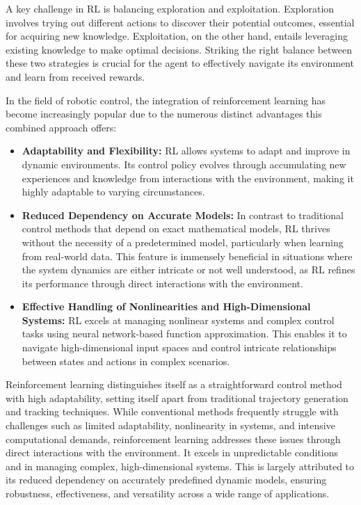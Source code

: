 A key challenge in RL is balancing exploration and exploitation. Exploration involves trying out different actions to discover their potential outcomes, essential for acquiring new knowledge. Exploitation, on the other hand, entails leveraging existing knowledge to make optimal decisions. Striking the right balance between these two strategies is crucial for the agent to effectively navigate its environment and learn from received rewards.

In the field of robotic control, the integration of reinforcement learning has become increasingly popular due to the numerous distinct advantages this combined approach offers:

\begin{itemize}
    \item \textbf{Adaptability and Flexibility:}
    RL allows systems to adapt and improve in dynamic environments. Its control policy evolves through accumulating new experiences and knowledge from interactions with the environment, making it highly adaptable to varying circumstances.

    \item \textbf{Reduced Dependency on Accurate Models:}
    In contrast to traditional control methods that depend on exact mathematical models, RL thrives without the necessity of a predetermined model, particularly when learning from real-world data. This feature is immensely beneficial in situations where the system dynamics are either intricate or not well understood, as RL refines its performance through direct interactions with the environment.

    \item \textbf{Effective Handling of Nonlinearities and High-Dimensional Systems:}
    RL excels at managing nonlinear systems and complex control tasks using neural network-based function approximation. This enables it to navigate high-dimensional input spaces and control intricate relationships between states and actions in complex scenarios.
\end{itemize}

Reinforcement learning distinguishes itself as a straightforward control method with high adaptability, setting itself apart from traditional trajectory generation and tracking techniques. While conventional methods frequently struggle with challenges such as limited adaptability, nonlinearity in systems, and intensive computational demands, reinforcement learning addresses these issues through direct interactions with the environment. It excels in unpredictable conditions and in managing complex, high-dimensional systems. This is largely attributed to its reduced dependency on accurately predefined dynamic models, ensuring robustness, effectiveness, and versatility across a wide range of applications.


